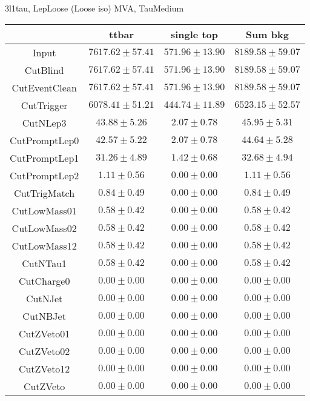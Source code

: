 \documentclass[11pt]{article}
\begin{document}
3l1tau, LepLoose (Loose iso) MVA, TauMedium\\
\begin{tabular}{|c|c|c|c|}
\hline
              & ttbar               & single top         & Sum bkg            \\
\hline
Input         & $7617.62 \pm 57.41$ & $571.96 \pm 13.90$ & $8189.58 \pm 59.07$\\
CutBlind      & $7617.62 \pm 57.41$ & $571.96 \pm 13.90$ & $8189.58 \pm 59.07$\\
CutEventClean & $7617.62 \pm 57.41$ & $571.96 \pm 13.90$ & $8189.58 \pm 59.07$\\
CutTrigger    & $6078.41 \pm 51.21$ & $444.74 \pm 11.89$ & $6523.15 \pm 52.57$\\
CutNLep3      &    $43.88 \pm 5.26$ &    $2.07 \pm 0.78$ &    $45.95 \pm 5.31$\\
CutPromptLep0 &    $42.57 \pm 5.22$ &    $2.07 \pm 0.78$ &    $44.64 \pm 5.28$\\
CutPromptLep1 &    $31.26 \pm 4.89$ &    $1.42 \pm 0.68$ &    $32.68 \pm 4.94$\\
CutPromptLep2 &     $1.11 \pm 0.56$ &    $0.00 \pm 0.00$ &     $1.11 \pm 0.56$\\
CutTrigMatch  &     $0.84 \pm 0.49$ &    $0.00 \pm 0.00$ &     $0.84 \pm 0.49$\\
CutLowMass01  &     $0.58 \pm 0.42$ &    $0.00 \pm 0.00$ &     $0.58 \pm 0.42$\\
CutLowMass02  &     $0.58 \pm 0.42$ &    $0.00 \pm 0.00$ &     $0.58 \pm 0.42$\\
CutLowMass12  &     $0.58 \pm 0.42$ &    $0.00 \pm 0.00$ &     $0.58 \pm 0.42$\\
CutNTau1      &     $0.58 \pm 0.42$ &    $0.00 \pm 0.00$ &     $0.58 \pm 0.42$\\
CutCharge0    &     $0.00 \pm 0.00$ &    $0.00 \pm 0.00$ &     $0.00 \pm 0.00$\\
CutNJet       &     $0.00 \pm 0.00$ &    $0.00 \pm 0.00$ &     $0.00 \pm 0.00$\\
CutNBJet      &     $0.00 \pm 0.00$ &    $0.00 \pm 0.00$ &     $0.00 \pm 0.00$\\
CutZVeto01    &     $0.00 \pm 0.00$ &    $0.00 \pm 0.00$ &     $0.00 \pm 0.00$\\
CutZVeto02    &     $0.00 \pm 0.00$ &    $0.00 \pm 0.00$ &     $0.00 \pm 0.00$\\
CutZVeto12    &     $0.00 \pm 0.00$ &    $0.00 \pm 0.00$ &     $0.00 \pm 0.00$\\
CutZVeto      &     $0.00 \pm 0.00$ &    $0.00 \pm 0.00$ &     $0.00 \pm 0.00$\\
\hline
\end{tabular}
\end{document}
